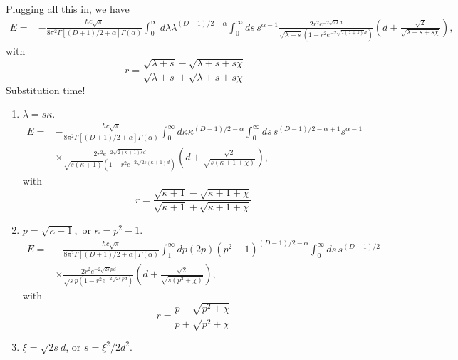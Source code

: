 Plugging all this in, we have 
\begin{align}
E  =& - \frac{\hbar c\sqrt{\pi}}{8\pi^2\Gamma[(D+1)/2+\alpha]\Gamma(\alpha)} \int_0^\infty d\lambda \lambda^{(D-1)/2-\alpha}\int_0^\infty ds\, s^{\alpha-1}\frac{2r^2 e^{-2\sqrt{2\lambda}d}}{\sqrt{\lambda+s}(1-r^2 e^{-2\sqrt{2(\lambda+s)}d})}\left( d + \frac{\sqrt{2}}{\sqrt{\lambda+s+s\chi}} \right),
\end{align}
with 
\begin{equation}
r = \frac{ \sqrt{\lambda+s} - \sqrt{\lambda+s+s\chi}}{ \sqrt{\lambda+s} + \sqrt{\lambda+s+s\chi}}
\end{equation}
Substitution time!
\begin{enumerate}
\item $\lambda = s\kappa$.
\begin{align}
E  =& - \frac{\hbar c\sqrt{\pi}}{8\pi^2\Gamma[(D+1)/2+\alpha]\Gamma(\alpha)} \int_0^\infty d\kappa \kappa^{(D-1)/2-\alpha}\int_0^\infty ds\, s^{(D-1)/2-\alpha+1} s^{\alpha-1}\nonumber\\
&\times \frac{2r^2 e^{-2\sqrt{2(\kappa+1)s}d}}{\sqrt{s(\kappa+1)}(1-r^2 e^{-2\sqrt{2s(\kappa+1)}d})}\left( d + \frac{\sqrt{2}}{\sqrt{s(\kappa+1+\chi)}} \right),
\end{align}
with 
\begin{equation}
r = \frac{ \sqrt{\kappa+1} - \sqrt{\kappa+1+\chi}}{ \sqrt{\kappa+1} + \sqrt{\kappa+1+\chi}}
\end{equation}
\item $p = \sqrt{\kappa+1},$ or $\kappa = p^2-1$. 
\begin{align}
E  =& - \frac{\hbar c\sqrt{\pi}}{8\pi^2\Gamma[(D+1)/2+\alpha]\Gamma(\alpha)} \int_1^\infty dp (2p) (p^2-1)^{(D-1)/2-\alpha}\int_0^\infty ds\, s^{(D-1)/2}\nonumber\\
&\times \frac{2r^2 e^{-2\sqrt{2s}pd}}{\sqrt{s}p(1-r^2 e^{-2\sqrt{2s}pd})}\left( d + \frac{\sqrt{2}}{\sqrt{s(p^2+\chi)}} \right),
\end{align}
with 
\begin{equation}
r = \frac{ p - \sqrt{p^2+\chi}}{ p + \sqrt{p^2+\chi}}
\end{equation}
\item $\xi = \sqrt{2s} d$, or $s = \xi^2/2 d^2$.  


\end{enumerate}
